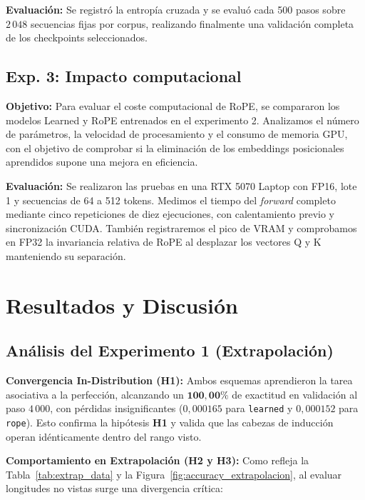 \documentclass[11pt]{article}
\begin{document}
\textbf{Evaluación:} Se registró la entropía cruzada y se evaluó cada 500 pasos sobre $2\,048$ secuencias fijas por corpus, realizando finalmente una validación completa de los checkpoints seleccionados.


\subsection{Exp. 3: Impacto computacional}

\textbf{Objetivo:} Para evaluar el coste computacional
de RoPE, se compararon los modelos Learned y RoPE entrenados en
el experimento 2. Analizamos el número de parámetros, la
velocidad de procesamiento y el consumo de memoria GPU, con
el objetivo de comprobar si la eliminación de los embeddings
posicionales aprendidos supone una mejora en eficiencia.

\textbf{Evaluación:} Se realizaron las pruebas en
una RTX 5070 Laptop con FP16, lote 1 y secuencias de 64 a
512 tokens. Medimos el tiempo del \textit{forward} completo
mediante cinco repeticiones de diez ejecuciones, con calentamiento
previo y sincronización CUDA. También registraremos el pico
de VRAM y comprobamos en FP32 la invariancia relativa de
RoPE al desplazar los vectores Q y K manteniendo su separación.

\section{Resultados y Discusión}

\subsection{Análisis del Experimento 1 (Extrapolación)}
\textbf{Convergencia In-Distribution (H1):} Ambos esquemas aprendieron la tarea asociativa a la perfección, alcanzando un $\mathbf{100{,}00\%}$ de exactitud en validación al paso $4\,000$, con pérdidas insignificantes ($0{,}000165$ para \texttt{learned} y $0{,}000152$ para \texttt{rope}). Esto confirma la hipótesis \textbf{H1} y valida que las cabezas de inducción operan idénticamente dentro del rango visto.

\textbf{Comportamiento en Extrapolación (H2 y H3):} Como refleja la Tabla~\ref{tab:extrap_data} y la Figura~\ref{fig:accuracy_extrapolacion}, al evaluar longitudes no vistas surge una divergencia crítica:
\end{document}
